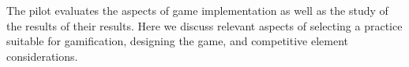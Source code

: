 \documentclass{sig-alternate}
\begin{document}

The pilot evaluates the aspects of game implementation as well as the study of the results of their results. Here we discuss  relevant aspects of selecting a practice suitable for gamification, designing the game, and competitive element considerations.
\end{document}
